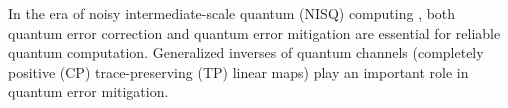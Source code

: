 \documentclass[submission,copyright,creativecommons]{eptcs}
\begin{document}


In the era of noisy intermediate-scale quantum (NISQ) computing \cite{Pre18}, both quantum error correction \cite{chatterjee2023quantum} and quantum error mitigation \cite{cao2021nisq,cai2023quantum} are essential for reliable quantum computation. Generalized inverses \cite{campbell2009generalized} of quantum channels (completely positive (CP) trace-preserving (TP) linear maps) play an important role in quantum error mitigation. 
\end{document}
